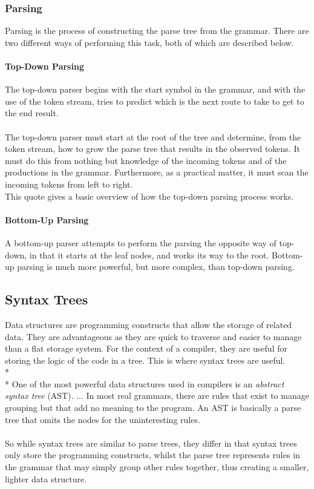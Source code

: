 \documentclass[12pt]{report}
\begin{document}
\subsubsection{Parsing}\label{subsec:parsing}
Parsing is the process of constructing the parse tree from the grammar.  There are two different ways of performing this task, both of which are described below.
\paragraph{Top-Down Parsing}
The top-down parser begins with the start symbol in the grammar, and with the use of the token stream, tries to predict which is the next route to take to get to the end result.\\
\\
The top-down parser must start at the root of the tree and determine, from the token stream, how to grow the parse tree that results in the observed tokens.  It must do this from nothing but knowledge of the incoming tokens and of the productions in the grammar.  Furthermore, as a practical matter, it must scan the incoming tokens from left to right. \citep{compilerconstruction92}
\\
This quote gives a basic overview of how the top-down parsing process works.
\paragraph{Bottom-Up Parsing}
A bottom-up parser attempts to perform the parsing the opposite way of top-down, in that it starts at the leaf nodes, and works its way to the root.  Bottom-up parsing is much more powerful, but more complex, than top-down parsing.
\subsection{Syntax Trees}\label{subsec:syntax_trees}
Data structures are programming constructs that allow the storage of related data.  They are advantageous as they are quick to traverse and easier to manage than a flat storage system.  For the context of a compiler, they are useful for storing the logic of the code in a tree.  This is where syntax trees are useful.\\*
\\*
One of the most powerful data structures used in compilers is an \textit{abstract syntax tree} (AST). ... In most real grammars, there are rules that exist to manage grouping but that add no meaning to the program.  An AST is basically a parse tree that omits the nodes for the uninteresting rules. \citep{flexandbison09}\\
\\
So while syntax trees are similar to parse trees, they differ in that syntax trees only store the programming constructs, whilst the parse tree represents rules in the grammar that may simply group other rules together, thus creating a smaller, lighter data structure.\\
\\
\end{document}
